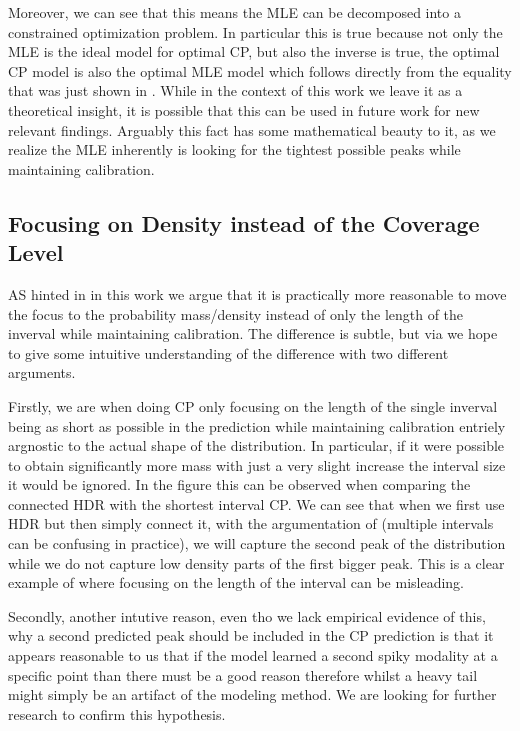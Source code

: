 Moreover, we can see that this means the MLE can be decomposed into a constrained optimization problem. In particular this is true because not only the MLE is the ideal model for optimal CP, but also the inverse is true, the optimal CP model is also the optimal MLE model which follows directly from the equality that was just shown in . While in the context of this work we leave it as a theoretical insight, it is possible that this can be used in future work for new relevant findings. Arguably this fact has some mathematical beauty to it, as we realize the MLE inherently is looking for the tightest possible peaks while maintaining calibration. %

\subsection{Focusing on Density instead of the Coverage Level}\label{sec:density_focus}

AS hinted in  in this work we argue that it is practically more reasonable to move the focus to the probability mass/density instead of only the length of the inverval while maintaining calibration. The difference is subtle, but via  we hope to give some intuitive understanding of the difference with two different arguments.

Firstly, we are when doing CP only focusing on the length of the single inverval being as short as possible in the prediction while maintaining calibration entriely argnostic to the actual shape of the distribution. In particular, if it were possible to obtain significantly more mass with just a very slight increase the interval size it would be ignored. In the figure this can be observed when comparing the connected HDR with the shortest interval CP. We can see that when we first use HDR but then simply connect it, with the argumentation of \cite{sesia2021conformal} (multiple intervals can be confusing in practice), we will capture the second peak of the distribution while we do not capture low density parts of the first bigger peak. This is a clear example of where focusing on the length of the interval can be misleading.

Secondly, another intutive reason, even tho we lack empirical evidence of this, why a second predicted peak should be included in the CP prediction is that it appears reasonable to us that if the model learned a second spiky modality at a specific point than there must be a good reason therefore whilst a heavy tail might simply be an artifact of the modeling method. We are looking for further research to confirm this hypothesis.

